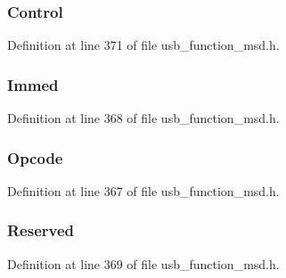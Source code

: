 \subsubsection[{Control}]{ Control}\label{struct_stop_start_c_b_a5dc24656c27deb12af74c98930f0bfc5}


Definition at line 371 of file usb\+\_\+function\+\_\+msd.\+h.

\hypertarget{struct_stop_start_c_b_a6702d02885cabae31194bbf01830f5d3}{}
\subsubsection[{Immed}]{ Immed}\label{struct_stop_start_c_b_a6702d02885cabae31194bbf01830f5d3}


Definition at line 368 of file usb\+\_\+function\+\_\+msd.\+h.

\hypertarget{struct_stop_start_c_b_a3ac7536b907732d60214ae553910eed9}{}
\subsubsection[{Opcode}]{ Opcode}\label{struct_stop_start_c_b_a3ac7536b907732d60214ae553910eed9}


Definition at line 367 of file usb\+\_\+function\+\_\+msd.\+h.

\hypertarget{struct_stop_start_c_b_a3aef54172eb78efe737c8eb7b0093d3c}{}
\subsubsection[{Reserved}]{ Reserved}\label{struct_stop_start_c_b_a3aef54172eb78efe737c8eb7b0093d3c}


Definition at line 369 of file usb\+\_\+function\+\_\+msd.\+h.

\hypertarget{struct_stop_start_c_b_a0f967bae823a6ead3de270c3afe9435d}{}
